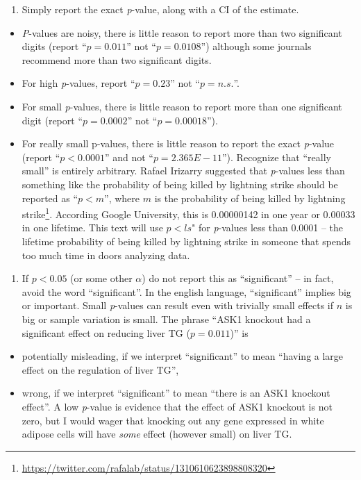 \documentclass[]{book}
\providecommand{\tightlist}{%
  \setlength{\itemsep}{0pt}\setlength{\parskip}{0pt}}
\let\rmarkdownfootnote\footnote%
\def\footnote{\protect\rmarkdownfootnote}
\begin{document}
\begin{enumerate}
\def\labelenumi{\arabic{enumi}.}
\tightlist
\item
  Simply report the exact \emph{p}-value, along with a CI of the estimate.
\end{enumerate}

\begin{itemize}
\tightlist
\item
  \emph{P}-values are noisy, there is little reason to report more than two significant digits (report ``\(p = 0.011\)'' not ``\(p = 0.0108\)'') although some journals recommend more than two significant digits.
\item
  For high \emph{p}-values, report ``\(p = 0.23\)'' not ``\(p = n.s.\)''.
\item
  For small \emph{p}-values, there is little reason to report more than one significant digit (report ``\(p = 0.0002\)'' not ``\(p = 0.00018\)'').
\item
  For really small p-values, there is little reason to report the exact \emph{p}-value (report ``\(p < 0.0001\)'' and not ``\(p = 2.365E-11\)''). Recognize that ``really small'' is entirely arbitrary. Rafael Irizarry suggested that \emph{p}-values less than something like the probability of being killed by lightning strike should be reported as ``\(p < m\)'', where \(m\) is the probability of being killed by lightning strike\footnote{\url{https://twitter.com/rafalab/status/1310610623898808320}}. According Google University, this is 0.00000142 in one year or 0.00033 in one lifetime. This text will use \(p < ls\)" for \emph{p}-values less than 0.0001 -- the lifetime probability of being killed by lightning strike in someone that spends too much time in doors analyzing data.
\end{itemize}

\begin{enumerate}
\def\labelenumi{\arabic{enumi}.}
\setcounter{enumi}{1}
\tightlist
\item
  If \(p < 0.05\) (or some other \(\alpha\)) do not report this as ``significant'' -- in fact, avoid the word ``significant''. In the english language, ``significant'' implies big or important. Small \emph{p}-values can result even with trivially small effects if \(n\) is big or sample variation is small. The phrase ``ASK1 knockout had a significant effect on reducing liver TG (\(p = 0.011\))'' is
\end{enumerate}

\begin{itemize}
\tightlist
\item
  potentially misleading, if we interpret ``significant'' to mean ``having a large effect on the regulation of liver TG'',
\item
  wrong, if we interpret ``significant'' to mean ``there is an ASK1 knockout effect''.
  A low \emph{p}-value is evidence that the effect of ASK1 knockout is not zero, but I would wager that knocking out any gene expressed in white adipose cells will have \emph{some} effect (however small) on liver TG.
\end{itemize}
\end{document}
